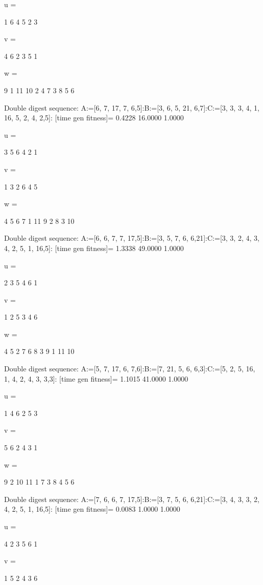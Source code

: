 u =

     1     6     4     5     2     3


v =

     4     6     2     3     5     1


w =

     9     1    11    10     2     4     7     3     8     5     6

Double digest sequence:
A:=[6, 7, 17, 7, 6,5]:B:=[3, 6, 5, 21, 6,7]:C:=[3, 3, 3, 4, 1, 16, 5, 2, 4, 2,5]:
[time gen fitness]=
    0.4228   16.0000    1.0000


u =

     3     5     6     4     2     1


v =

     1     3     2     6     4     5


w =

     4     5     6     7     1    11     9     2     8     3    10

Double digest sequence:
A:=[6, 6, 7, 7, 17,5]:B:=[3, 5, 7, 6, 6,21]:C:=[3, 3, 2, 4, 3, 4, 2, 5, 1, 16,5]:
[time gen fitness]=
    1.3338   49.0000    1.0000


u =

     2     3     5     4     6     1


v =

     1     2     5     3     4     6


w =

     4     5     2     7     6     8     3     9     1    11    10

Double digest sequence:
A:=[5, 7, 17, 6, 7,6]:B:=[7, 21, 5, 6, 6,3]:C:=[5, 2, 5, 16, 1, 4, 2, 4, 3, 3,3]:
[time gen fitness]=
    1.1015   41.0000    1.0000


u =

     1     4     6     2     5     3


v =

     5     6     2     4     3     1


w =

     9     2    10    11     1     7     3     8     4     5     6

Double digest sequence:
A:=[7, 6, 6, 7, 17,5]:B:=[3, 7, 5, 6, 6,21]:C:=[3, 4, 3, 3, 2, 4, 2, 5, 1, 16,5]:
[time gen fitness]=
    0.0083    1.0000    1.0000


u =

     4     2     3     5     6     1


v =

     1     5     2     4     3     6


